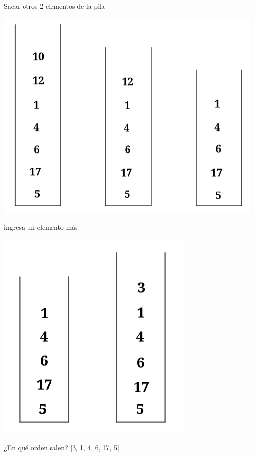 \begin{enumerate}
\begin{center}
       \end{center}
       Sacar otros 2 elementos de la pila
       \begin{center}
          \includegraphics[scale=0.3]{../Image/P4.png}
       \end{center}
       ingresa un elemento más
       \begin{center}
          \includegraphics[scale=0.3]{../Image/P5.png}
       \end{center}
       ¿En qué orden salen? [3, 1, 4, 6, 17, 5].
       

\end{enumerate}

